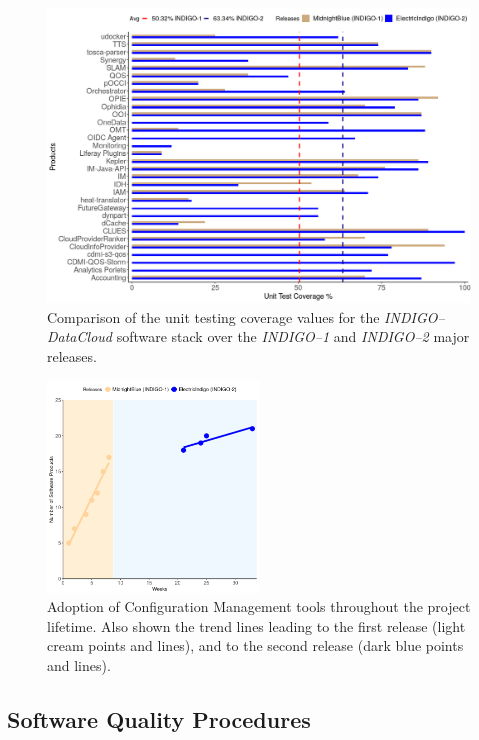 \documentclass[journal]{IEEEtran}
\begin{document}
\begin{figure}[ht]
\centering
\includegraphics[width=\textwidth]{images/fig2.png}
\caption{Comparison of the unit testing coverage values for the {\sl INDIGO--DataCloud}
software stack over the {\sl INDIGO--1} and {\sl INDIGO--2} major releases.}
\label{fig:fig_unittest}
\end{figure}

\begin{figure}[ht]
\centering
\includegraphics[width=0.5\textwidth]{images/fig3.png}
\caption{Adoption of Configuration Management tools throughout the project lifetime. Also shown the trend lines
leading to the first release (light cream points and lines), and to the second release (dark blue points and lines).}
\label{fig:fig_confman}
\end{figure}

\subsection{Software Quality Procedures}
\label{subsec:sqa}
\end{document}
